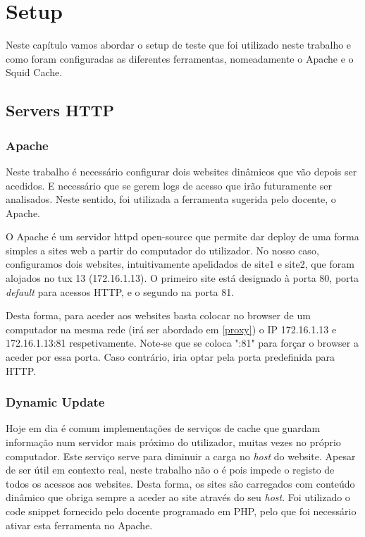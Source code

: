 \chapter{Setup}
Neste capítulo vamos abordar o setup de teste que foi utilizado neste trabalho e como foram configuradas as diferentes ferramentas,
nomeadamente o Apache e o Squid Cache.

\section{Servers HTTP}

\subsection{Apache}
Neste trabalho é necessário configurar dois websites dinâmicos que vão depois ser acedidos. E necessário que se gerem logs de acesso que irão
futuramente ser analisados. Neste sentido, foi utilizada a ferramenta sugerida pelo docente, o Apache.

O Apache é um servidor httpd open-source que permite dar deploy de uma forma simples a sites web a partir do computador do utilizador.
No nosso caso, configuramos dois websites, intuitivamente apelidados de site1 e site2, que foram alojados no tux 13 (172.16.1.13).
O primeiro site está designado à porta 80, porta \textit{default} para acessos HTTP, e o segundo na porta 81.

Desta forma, para aceder aos websites basta colocar no browser de um computador na mesma rede (irá ser abordado em \ref{proxy})
o IP 172.16.1.13 e 172.16.1.13:81 respetivamente. Note-se que se coloca ":81" para forçar o browser a aceder por essa porta. 
Caso contrário, iria optar pela porta predefinida para HTTP.

\subsection{Dynamic Update}
Hoje em dia é comum implementações de serviços de cache que guardam informação num servidor mais próximo do utilizador,
muitas vezes no próprio computador. Este serviço serve para diminuir a carga no \textit{host} do website.
Apesar de ser útil em contexto real, neste trabalho não o é pois impede o registo de todos os acessos aos websites.
Desta forma, os sites são carregados com conteúdo dinâmico que obriga sempre a aceder ao site através do seu \textit{host}.
Foi utilizado o code snippet fornecido pelo docente programado em PHP, pelo que foi necessário ativar esta ferramenta no Apache.

